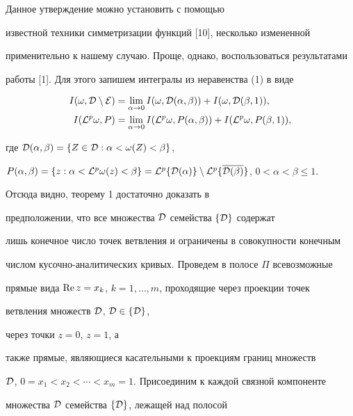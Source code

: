 \begin{pf}


Данное утверждение можно установить с помощью


известной техники симметризации функций [10], несколько измененной


применительно к нашему случаю. Проще, однако, воспользоваться результатами


работы [1]. Для этого запишем интегралы из неравенства (1) в виде


\begin{align*}


I(\omega,{\cal D}\setminus{\cal E})&=\lim_{\alpha\to 0}


I(\omega,{\cal D}(\alpha,\beta))+I(\omega,{\cal D}(\beta,1)),\\


%


I({\cal L}^p\omega,P)&=\lim_{\alpha\to 0}


I({\cal L}^p\omega,P(\alpha,\beta))+I({\cal L}^p\omega,P(\beta,1)),


\end{align*}


где ${\cal D}(\alpha,\beta)=\{Z\in{\cal D}:\alpha<\omega(Z)<\beta\}$,


$P(\alpha,\beta)=\{z:\alpha<{\cal L}^p\omega(z)<\beta\}=


{\cal L}^p\{{\cal D}(\alpha)\}\setminus{\cal L}^p\{\overline{{\cal


D}(\beta)}\}$, $ 0<\alpha<\beta\le 1.$


Отсюда видно, теорему 1 достаточно доказать в


предположении, что все множества ${\cal D}$ семейства $\{{\cal D}\}$ содержат


лишь конечное число точек ветвления и ограничены в совокупности конечным


числом кусочно-аналитических кривых. Проведем в полосе $\Pi$ всевозможные


прямые вида $\operatorname{Re} z=x_k$, $k=1,\dotsc,m$, проходящие через проекции точек


ветвления множеств ${\cal D}$, ${\cal D}\in \{{\cal D}\}$,


через точки $z=0$, $z=1$, а


также прямые, являющиеся касательными к проекциям границ множеств


${\cal D}$, $0=x_1<x_2<\dotsb<x_m=1$. Присоединим к каждой связной компоненте


множества ${\cal D}$ семейства $\{{\cal D}\}$, лежащей над полосой



\end{pf}
